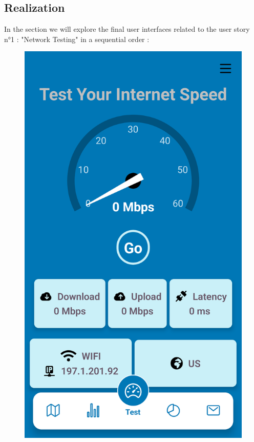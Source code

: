 \subsection{Realization}
In the section we will explore the final user interfaces related to the user story n°1 : "Network Testing" in a sequential order :
\begin{figure}[H]
\begin{minipage}{0.32\textwidth}
    \centering
    \includegraphics[width=\linewidth]{images/sprint2/testModuleInit.png}

\end{minipage}
\end{figure}
